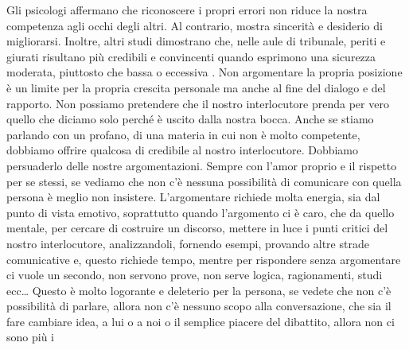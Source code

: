 \documentclass[12pt]{book} %
\begin{document}
Gli psicologi affermano che riconoscere i propri errori non riduce la nostra competenza agli occhi degli altri. Al contrario, mostra sincerità e desiderio di migliorarsi. Inoltre, altri studi dimostrano che, nelle aule di tribunale, periti e giurati risultano più credibili e convincenti quando esprimono una sicurezza moderata, piuttosto che bassa o eccessiva .
Non argomentare la propria posizione è un limite per la propria crescita personale ma anche al fine del
dialogo e del rapporto. Non possiamo pretendere che il nostro interlocutore prenda per vero quello che diciamo solo perché è uscito
dalla nostra bocca. Anche se stiamo parlando con un profano, di una materia in cui non è molto competente, dobbiamo
offrire qualcosa di credibile al nostro interlocutore. Dobbiamo persuaderlo delle nostre argomentazioni. Sempre con
l'amor proprio e il rispetto per se stessi, se vediamo che non c'è nessuna
possibilità di comunicare con quella persona è meglio non insistere. L'argomentare richiede molta
energia, sia dal punto di vista emotivo, soprattutto quando l'argomento ci è caro, che da quello
mentale, per cercare di costruire un discorso, mettere in luce i punti critici del nostro interlocutore, analizzandoli,
fornendo esempi, provando altre strade comunicative e, questo richiede tempo, mentre per rispondere senza argomentare ci vuole
un secondo, non servono prove, non serve logica, ragionamenti, studi ecc… Questo è molto logorante e deleterio per la
persona, se vedete che non c'è possibilità di parlare, allora non c'è nessuno
scopo alla conversazione, che sia il fare cambiare idea, a lui o a noi o il semplice piacere del dibattito, allora non ci sono più i
\end{document}
